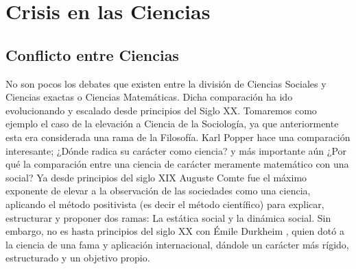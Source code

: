 \section{Crisis en las Ciencias}
\label{sec:crisis-ciencias}

\subsection{Conflicto entre Ciencias}
\label{ssec:conflicto-ciencias}

No son pocos los debates que existen entre la división de Ciencias Sociales y Ciencias exactas 
o Ciencias Matemáticas. Dicha comparación ha ido evolucionando y escalado desde principios del Siglo XX.
Tomaremos como ejemplo el caso de la elevación a Ciencia de la Sociología, ya que anteriormente esta 
era considerada una rama de la Filosofía. Karl Popper \cite{popper_miseria_2014} hace una comparación 
interesante; ¿Dónde radica su carácter como ciencia? y más importante aún ¿Por qué la comparación entre 
una ciencia de carácter meramente matemático con una social? Ya desde principios del siglo XIX Auguste
Comte fue el máximo exponente de elevar a la observación de las sociedades como una
ciencia, aplicando el método positivista (es decir el método científico) para explicar, estructurar
y proponer dos ramas: La estática social y la dinámica social. Sin embargo, no es hasta
principios del siglo XX con Émile Durkheim \cite{durkheim_reglas}, quien dotó a
la ciencia de una fama y aplicación internacional, dándole un carácter más rígido, estructurado
y un objetivo propio.

